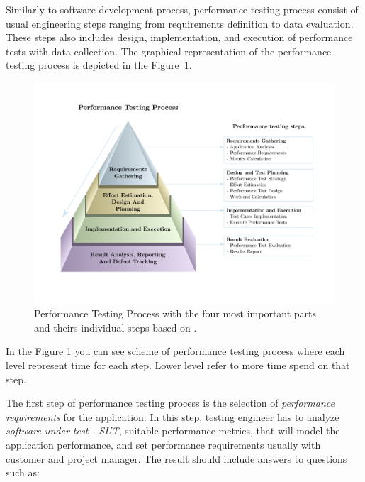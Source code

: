 
Similarly to software development process, performance testing process consist of usual engineering steps ranging from requirements definition to data evaluation. These steps also includes design, implementation, and execution of performance tests with data collection. The graphical representation of the performance testing process is depicted in the Figure~\ref{fig:performace_testing_process}. 

\begin{figure}[H]
  \includegraphics[width=16cm]{obrazky-figures/pyramid.pdf}
  \captionsetup{justification=centering}
  \caption{Performance Testing Process with the four most important parts and theirs individual steps based on \cite{Sharma:HP}.}
  \label{fig:performace_testing_process}
\end{figure}
In the Figure \ref{fig:performace_testing_process} you can see scheme of performance testing process where each level represent time for each step. Lower level refer to more time spend on that step.

The first step of performance testing process is the selection of \emph{performance requirements} for the application. In this step, testing engineer has to analyze \emph{software under test - SUT}, suitable performance metrics, that will model the application performance, and set performance requirements usually with customer and project manager. The result should include answers to questions such as:

